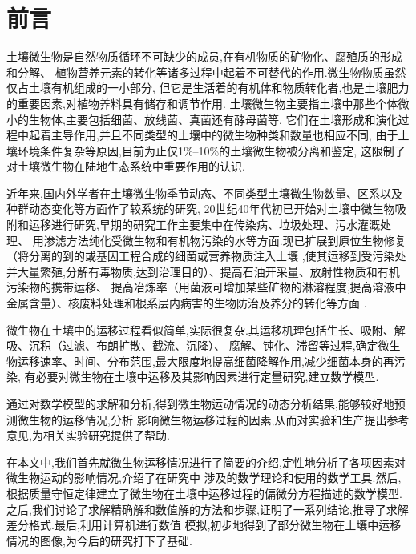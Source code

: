 \chapter*{前\qquad 言}
土壤微生物是自然物质循环不可缺少的成员,在有机物质的矿物化、腐殖质的形成和分解、
植物营养元素的转化等诸多过程中起着不可替代的作用.微生物物质虽然仅占土壤有机组成的一小部分,
但它是生活着的有机体和物质转化者,也是土壤肥力的重要因素,对植物养料具有储存和调节作用.
土壤微生物主要指土壤中那些个体微小的生物体,主要包括细菌、放线菌、真菌还有酵母菌等,
它们在土壤形成和演化过程中起着主导作用,并且不同类型的土壤中的微生物种类和数量也相应不同,
由于土壤环境条件复杂等原因,目前为止仅1\%--10\%的土壤微生物被分离和鉴定,
这限制了对土壤微生物在陆地生态系统中重要作用的认识.\par
近年来,国内外学者在土壤微生物季节动态、不同类型土壤微生物数量、区系以及种群动态变化等方面作了较系统的研究,
20世纪40年代初已开始对土壤中微生物吸附和运移进行研究,早期的研究工作主要集中在传染病、垃圾处理、污水灌溉处理、
用渗滤方法纯化受微生物和有机物污染的水等方面.现已扩展到原位生物修复（将分离的到的或基因工程合成的细菌或营养物质注入土壤
,使其运移到受污染处并大量繁殖,分解有毒物质,达到治理目的）、提高石油开采量、放射性物质和有机污染物的携带运移、
提高冶炼率（用菌液可增加某些矿物的淋溶程度,提高溶液中金属含量）、核废料处理和根系层内病害的生物防治及养分的转化等方面
.\par
微生物在土壤中的运移过程看似简单,实际很复杂.其运移机理包括生长、吸附、解吸、沉积（过滤、布朗扩散、截流、沉降）、
腐解、钝化、滞留等过程,确定微生物运移速率、时间、分布范围,最大限度地提高细菌降解作用,减少细菌本身的再污染,
有必要对微生物在土壤中运移及其影响因素进行定量研究,建立数学模型.\par
通过对数学模型的求解和分析,得到微生物运动情况的动态分析结果,能够较好地预测微生物的运移情况,分析
影响微生物运移过程的因素,从而对实验和生产提出参考意见,为相关实验研究提供了帮助.\par
在本文中,我们首先就微生物运移情况进行了简要的介绍,定性地分析了各项因素对微生物运动的影响情况,介绍了在研究中
涉及的数学理论和使用的数学工具.然后,根据质量守恒定律建立了微生物在土壤中运移过程的偏微分方程描述的数学模型.
之后,我们讨论了求解精确解和数值解的方法和步骤,证明了一系列结论,推导了求解差分格式.最后,利用计算机进行数值
模拟,初步地得到了部分微生物在土壤中运移情况的图像,为今后的研究打下了基础.
